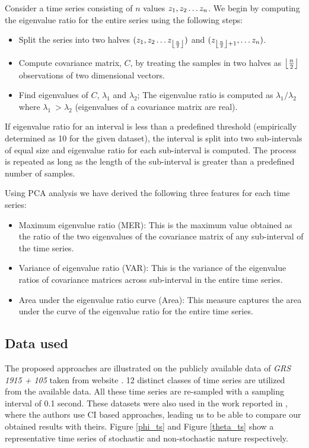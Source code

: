 \documentclass[10pt,conference]{IEEEtran}
\DeclarePairedDelimiter\floor{\lfloor}{\rfloor}
\begin{document}
Consider a time series consisting of $n$ values  $z_1, z_2 \mathellipsis z_n$. We begin by computing the eigenvalue ratio for the entire series using the following steps:
\begin{itemize}
\item  Split the series into two halves $(z_1, z_2 \mathellipsis z_{\floor*{\frac{n}{2}}})$ and $(z_{\floor*{\frac{n}{2}} + 1}, \mathellipsis z_n)$.
\item Compute covariance matrix, $C$,  by treating the samples in two halves as $\floor*{\frac{n}{2}}$ observations of two dimensional vectors.
\item Find eigenvalues of $C$, $\lambda_1$ and $\lambda_2$; The eigenvalue ratio is computed as  $\lambda_1/\lambda_2$ where $\lambda_1 \ > \lambda_2$ (eigenvalues of a covariance matrix are real).
\end{itemize}
If eigenvalue ratio for an interval is less than a predefined threshold (empirically determined as 10 for the given dataset), the interval is split into two sub-intervals of equal size and eigenvalue ratio for each sub-interval is computed. The process is repeated as long as the length of the sub-interval is greater than a predefined number of samples.

Using PCA analysis we have derived the following three features for each time series:
\begin{itemize}
\item Maximum eigenvalue ratio (MER): This is the maximum value obtained as the ratio of the two eigenvalues of the covariance matrix of any sub-interval of the time series.
\item Variance of eigenvalue ratio (VAR): This is the variance of the eigenvalue ratios of covariance matrices across sub-interval in the entire time series.
\item Area under the eigenvalue ratio curve (Area): This measure captures the area under the curve of the eigenvalue ratio for the entire time series.
\end{itemize}

\subsection{Data used}
The proposed approaches are illustrated on the publicly available data of \textit{GRS 1915 + 105} taken from website \cite{xte}. 12 distinct classes of time series are utilized from the available data. All these time series are re-sampled with a sampling interval of 0.1 second. These datasets  were  also used in the work reported in \cite{Adegoke2018}, where the authors use CI based approaches, leading us to be able to compare our obtained results with theirs. Figure \ref{phi_ts} and Figure \ref{theta_ts} show a representative time series of stochastic and non-stochastic  nature respectively.
\end{document}
